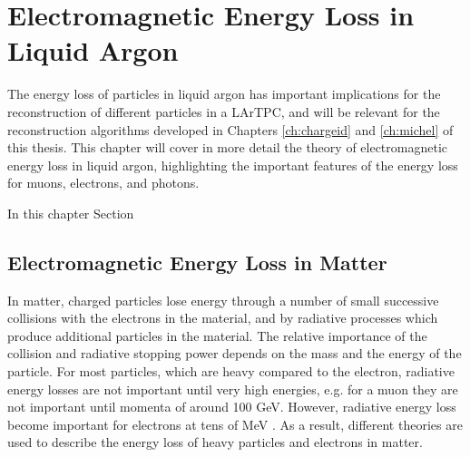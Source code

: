 \chapter{\label{ch:energyloss}Electromagnetic Energy Loss in Liquid Argon} 

% 

\minitoc

The energy loss of particles in liquid argon has important implications for the
reconstruction of different particles in a LArTPC, and will be relevant for the
reconstruction algorithms developed in Chapters \ref{ch:chargeid} and 
\ref{ch:michel} of  this thesis. This chapter will cover in more detail the 
theory of electromagnetic energy loss in liquid argon, highlighting the 
important features of the energy loss for muons, electrons, and photons.

In this chapter Section 

\section{Electromagnetic Energy Loss in Matter}
In matter, charged particles lose energy through a number of small successive
collisions with the electrons in the material, and by radiative processes which
produce additional particles in the material. The relative importance of the
collision and radiative stopping power depends on the mass and the energy of the
particle. For most particles, which are heavy compared to the electron, 
radiative energy losses are not important until very high energies, e.g. for a 
muon they are not important until momenta of around 100 GeV. However, 
radiative energy loss become important for electrons at tens of MeV 
\cite{PhysRevD.98.030001}. As a result, different theories are used to 
describe the energy loss of heavy particles and electrons in matter.

